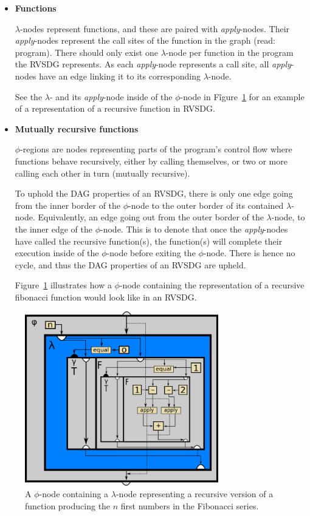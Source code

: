 \begin{itemize}
\clearpage
\item \textbf{Functions}

\textit{$\lambda$}-nodes represent functions, and these are paired with
\textit{apply}-nodes. Their \textit{apply}-nodes represent the call sites of the
function in the graph (read: program). There should only exist one
$\lambda$-node per function in the program the RVSDG represents. As each
\textit{apply}-node represents a call site, all \textit{apply}-nodes have an
edge linking it to its corresponding $\lambda$-node.

See the $\lambda$- and its \textit{apply}-node inside of the $\phi$-node in
Fĩgure~\ref{fig:rec_fib_phi} for an example of a representation of a recursive
function in RVSDG.

\item \textbf{Mutually recursive functions}

\textit{$\phi$}-regions are nodes representing parts of the program's control
flow where functions behave recursively, either by calling themselves, or two or
more calling each other in turn (mutually recursive).

To uphold the DAG properties of an RVSDG, there is only one edge going from the
inner border of the $\phi$-node to the outer border of its contained
$\lambda$-node. Equivalently, an edge going out from the outer border of the
$\lambda$-node, to the inner edge of the $\phi$-node. This is to denote that
once the \textit{apply}-nodes have called the recursive function(s), the
function(s) will complete their execution inside of the $\phi$-node before
exiting the $\phi$-node. There is hence no cycle, and thus the DAG properties of
an RVSDG are upheld.

Figure~\ref{fig:rec_fib_phi} illustrates how a $\phi$-node containing the
representation of a recursive fibonacci function would look like in an RVSDG.

\end{itemize}

\begin{figure}[h!]
	\centering
	\includegraphics[width=0.75\textwidth]{figures/recursive_fibonacci}
	\caption{A $\phi$-node containing a $\lambda$-node representing a recursive
version of a function producing the $n$ first numbers in the Fibonacci series.}
	\label{fig:rec_fib_phi}
\end{figure}
